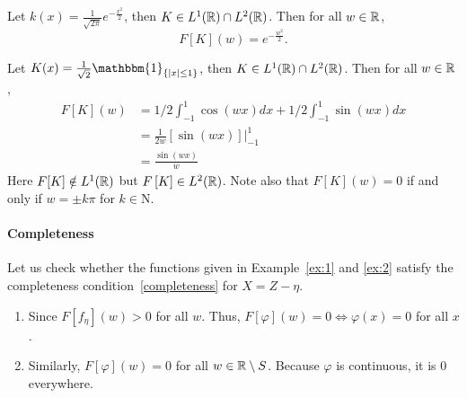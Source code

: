 \begin{example}
    \label{ex:1}
    Let $k(x)=\frac{1}{\sqrt{2\pi}}e^{-\frac{x^2}{2}}$, then $K\in L^1(\mathbb{R})\cap L^2(\mathbb{R})$. Then for all $w\in \mathbb{R}$, $$F[K](w)=e^{-\frac{w^2}{2}}.$$
\end{example}
\begin{example}
    \label{ex:2}
    Let $K(x)=\frac{1}{\sqrt{2}}\mathbbm{1}_{\{ \abs{x}\le 1\}}$, then $K\in L^1(\mathbb{R})\cap L^2(\mathbb{R})$. Then for all $w\in \mathbb{R}$,
    \begin{align*}
        F[K](w) & =1/2\int_{-1}^1 \cos(wx)dx+1/2\int_{-1}^1 \sin(wx)dx \\
                & =\frac{1}{2w}[\sin(wx)]\Big\vert_{-1}^1              \\
                & =\frac{\sin(wx)}{w}
    \end{align*}
    Here $F[K]\notin L^1(\mathbb{R})$ but $F\left[K\right]\in L^2(\mathbb{R})$. Note also that $F[K](w)=0$ if and only if $w=\pm k\pi$ for $k\in \mathrm{N}$.
\end{example}

\paragraph{Completeness} Let us check whether the functions given in Example~\ref{ex:1} and \ref{ex:2}
satisfy the completeness condition~\ref{completeness} for $X=Z-\eta$.
\begin{enumerate}
    \item Since $F[f_\eta](w)>0$ for all $w$. Thus, $F[\varphi](w)=0\Leftrightarrow
              \varphi(x)=0$ for all $x$.
    \item Similarly, $F[\varphi](w)=0$ for all $w\in \mathbb{R}\setminus S$. Because $\varphi$ is
          continuous, it is $0$ everywhere.
\end{enumerate}